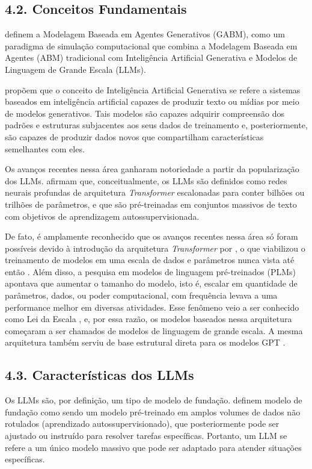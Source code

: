 \documentclass[12pt,oneside,a4paper,brazil,sumario=tradicional]{abntex2}
\begin{document}
\subsection*{4.2. Conceitos Fundamentais}
\textcite{adornetto2025} definem a Modelagem Baseada em Agentes Generativos (GABM), como um paradigma de simulação computacional que combina a Modelagem Baseada em Agentes (ABM) tradicional com  Inteligência Artificial Generativa e Modelos de Linguagem de Grande Escala (LLMs).

\textcite{sengar2024} propõem que o conceito de Inteligência Artificial Generativa se refere a sistemas baseados em inteligência artificial capazes de produzir texto ou mídias por meio de modelos generativos. Tais modelos são capazes adquirir compreensão dos padrões e estruturas subjacentes aos seus dados de treinamento e, posteriormente, são capazes de produzir dados novos que compartilham características semelhantes com eles.

Os avanços recentes nessa área ganharam notoriedade a partir da popularização dos LLMs. \textcite{zhao2023} afirmam que,  conceitualmente, os LLMs são definidos como redes neurais profundas de arquitetura \textit{Transformer} \parencite{vaswani2017} escalonadas para conter bilhões ou trilhões de parâmetros, e que são pré-treinadas em conjuntos massivos de texto com objetivos de aprendizagem autossupervisionada.

De fato, é amplamente reconhecido que os avanços recentes nessa área só foram possíveis devido à introdução da arquitetura \textit{Transformer} por \textcite{vaswani2017}, o que viabilizou o treinamento de modelos em uma escala de dados e parâmetros nunca vista até então \parencite{storey2025, narapareddy2025, he2025}. Além disso,  a pesquisa em modelos de linguagem pré-treinados (PLMs) apontava que aumentar o tamanho do modelo, isto é, escalar em quantidade de parâmetros, dados, ou poder computacional, com frequência levava a uma performance melhor em diversas atividades. Esse fenômeno veio a ser conhecido como Lei da Escala \parencite{kaplan2020, zhao2023}, e, por essa razão, os modelos baseados nessa arquitetura começaram a ser chamados de modelos de linguagem de grande escala. A mesma arquitetura também serviu de base estrutural direta para os modelos GPT .

\subsection*{4.3. Características dos LLMs}
Os LLMs são, por definição, um tipo de modelo de fundação. \textcite{bommasani2021} definem modelo de fundação como sendo um modelo pré-treinado em amplos volumes de dados não rotulados (aprendizado autossupervisionado), que posteriormente pode ser ajustado ou instruído para resolver tarefas específicas. Portanto, um LLM se refere a um único modelo massivo que pode ser adaptado para atender situações específicas.
\end{document}
